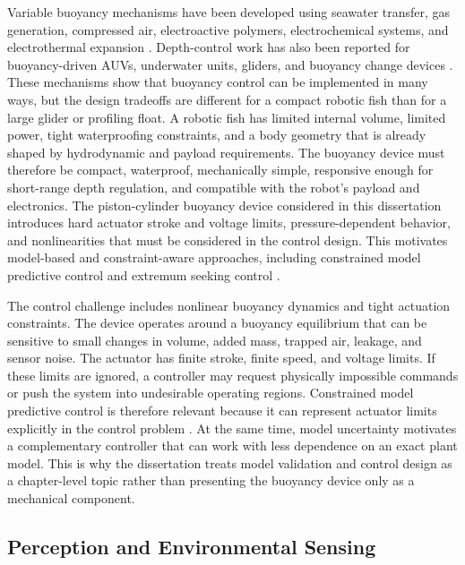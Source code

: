 \documentclass{uhcoethesis}
\begin{document}
Variable buoyancy mechanisms have been developed using seawater transfer, gas generation, compressed air, electroactive polymers, electrochemical systems, and electrothermal expansion \cite{Kobayashi2010,Vasiljevic2019,Um2011,Chen2017,Yazji2021,Wood2015,Hou2020}. Depth-control work has also been reported for buoyancy-driven AUVs, underwater units, gliders, and buoyancy change devices \cite{Choyekh2016,Claus2012,Carneiro2023}. These mechanisms show that buoyancy control can be implemented in many ways, but the design tradeoffs are different for a compact robotic fish than for a large glider or profiling float. A robotic fish has limited internal volume, limited power, tight waterproofing constraints, and a body geometry that is already shaped by hydrodynamic and payload requirements. The buoyancy device must therefore be compact, waterproof, mechanically simple, responsive enough for short-range depth regulation, and compatible with the robot's payload and electronics. The piston-cylinder buoyancy device considered in this dissertation introduces hard actuator stroke and voltage limits, pressure-dependent behavior, and nonlinearities that must be considered in the control design. This motivates model-based and constraint-aware approaches, including constrained model predictive control and extremum seeking control \cite{Rawlings2017,Scokaert1998,Masood2023,Masood2026ESCBCD}.

The control challenge includes nonlinear buoyancy dynamics and tight actuation constraints. The device operates around a buoyancy equilibrium that can be sensitive to small changes in volume, added mass, trapped air, leakage, and sensor noise. The actuator has finite stroke, finite speed, and voltage limits. If these limits are ignored, a controller may request physically impossible commands or push the system into undesirable operating regions. Constrained model predictive control is therefore relevant because it can represent actuator limits explicitly in the control problem \cite{Rawlings2017,Scokaert1998}. At the same time, model uncertainty motivates a complementary controller that can work with less dependence on an exact plant model. This is why the dissertation treats model validation and control design as a chapter-level topic rather than presenting the buoyancy device only as a mechanical component.

\subsection{Perception and Environmental Sensing}
\end{document}
